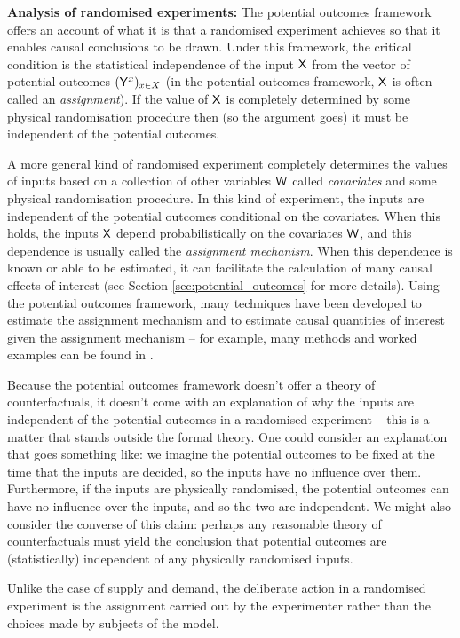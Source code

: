 \textbf{Analysis of randomised experiments:} The potential outcomes framework offers an account of what it is that a randomised experiment achieves so that it enables causal conclusions to be drawn. Under this framework, the critical condition is the statistical independence of the input $\mathsf{X}$ from the vector of potential outcomes $(\mathsf{Y}^x)_{x\in X}$ (in the potential outcomes framework, $\mathsf{X}$ is often called an \emph{assignment}). If the value of $\mathsf{X}$ is completely determined by some physical randomisation procedure then (so the argument goes) it must be independent of the potential outcomes. 

A more general kind of randomised experiment completely determines the values of inputs based on a collection of other variables $\mathsf{W}$ called \emph{covariates} and some physical randomisation procedure. In this kind of experiment, the inputs are independent of the potential outcomes conditional on the covariates. When this holds, the inputs $\mathsf{X}$ depend probabilistically on the covariates $\mathsf{W}$, and this dependence is usually called the \emph{assignment mechanism}. When this dependence is known or able to be estimated, it can facilitate the calculation of many causal effects of interest (see Section \ref{sec:potential_outcomes} for more details). Using the potential outcomes framework, many techniques have been developed to estimate the assignment mechanism and to estimate causal quantities of interest given the assignment mechanism -- for example, many methods and worked examples can be found in \citet{imbens_causal_2015}.

Because the potential outcomes framework doesn't offer a theory of counterfactuals, it doesn't come with an explanation of why the inputs are independent of the potential outcomes in a randomised experiment -- this is a matter that stands outside the formal theory. One could consider an explanation that goes something like: we imagine the potential outcomes to be fixed at the time that the inputs are decided, so the inputs have no influence over them. Furthermore, if the inputs are physically randomised, the potential outcomes can have no influence over the inputs, and so the two are independent. We might also consider the converse of this claim: perhaps any reasonable theory of counterfactuals must yield the conclusion that potential outcomes are (statistically) independent of any physically randomised inputs.

Unlike the case of supply and demand, the deliberate action in a randomised experiment is the assignment carried out by the experimenter rather than the choices made by subjects of the model.

